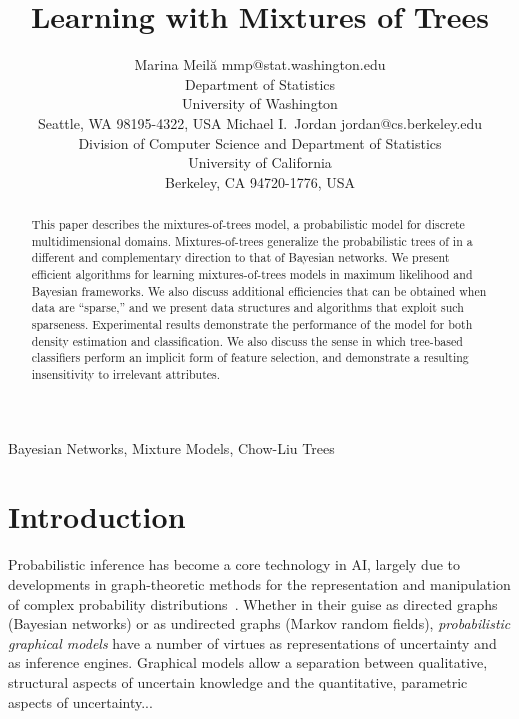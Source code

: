 \documentclass[twoside,11pt]{article}
\begin{document}
\title{Learning with Mixtures of Trees}

\author{\name Marina Meil\u{a} \email mmp@stat.washington.edu \\
       \addr Department of Statistics\\
       University of Washington\\
       Seattle, WA 98195-4322, USA
       \AND
       \name Michael I.\ Jordan \email jordan@cs.berkeley.edu \\
       \addr Division of Computer Science and Department of Statistics\\
       University of California\\
       Berkeley, CA 94720-1776, USA}


\maketitle

\begin{abstract}
This paper describes the mixtures-of-trees model, a probabilistic 
model for discrete multidimensional domains.  Mixtures-of-trees 
generalize the probabilistic trees of \citet{chow:68}
in a different and complementary direction to that of Bayesian networks.
We present efficient algorithms for learning mixtures-of-trees 
models in maximum likelihood and Bayesian frameworks. 
We also discuss additional efficiencies that can be
obtained when data are ``sparse,'' and we present data 
structures and algorithms that exploit such sparseness.
Experimental results demonstrate the performance of the 
model for both density estimation and classification. 
We also discuss the sense in which tree-based classifiers
perform an implicit form of feature selection, and demonstrate
a resulting insensitivity to irrelevant attributes.
\end{abstract}

\begin{keywords}
  Bayesian Networks, Mixture Models, Chow-Liu Trees
\end{keywords}

\section{Introduction}

Probabilistic inference has become a core technology in AI,
largely due to developments in graph-theoretic methods for the 
representation and manipulation of complex probability 
distributions~\citep{pearl:88}.  Whether in their guise as 
directed graphs (Bayesian networks) or as undirected graphs (Markov 
random fields), \emph{probabilistic graphical models} have a number 
of virtues as representations of uncertainty and as inference engines.  
Graphical models allow a separation between qualitative, structural
aspects of uncertain knowledge and the quantitative, parametric aspects 
of uncertainty...\\
\end{document}
